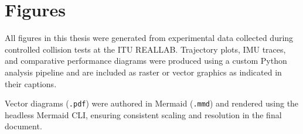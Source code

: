 \clearpage
\section{Figures}

All figures in this thesis were generated from experimental data collected during
controlled collision tests at the ITU REALLAB. Trajectory plots, IMU traces, and
comparative performance diagrams were produced using a custom Python analysis
pipeline and are included as raster or vector graphics as indicated in their captions.

Vector diagrams (\texttt{.pdf}) were authored in Mermaid (\texttt{.mmd}) and rendered
using the headless Mermaid CLI, ensuring consistent scaling and resolution in the
final document.
